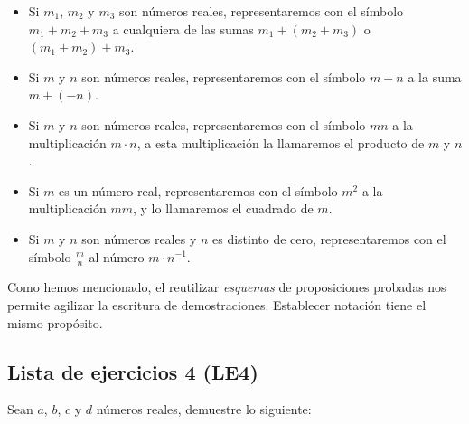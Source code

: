 \documentclass[11pt]{article}
\begin{document}
    \begin{itemize}
    \item Si $m_1$, $m_2$ y $m_3$ son números reales, representaremos con el símbolo $m_1+m_2+ m_3$ a cualquiera de las sumas $m_1+ \left(m_2+ m_3 \right)$ o $\left(m_1+ m_2 \right)+ m_3$.
    \item Si $m$ y $n$ son números reales, representaremos con el símbolo $m-n$ a la suma $m+ (-n)$.
    \item Si $m$ y $n$ son números reales, representaremos con el símbolo $mn$ a la multiplicación $m\cdot n$, a esta multiplicación la llamaremos el producto de $m$ y $n$.
    \item Si $m$ es un número real, representaremos con el símbolo $m^2$ a la multiplicación $mm$, y lo llamaremos el cuadrado de $m$.
    \item Si $m$ y $n$ son números reales y $n$ es distinto de cero, representaremos con el símbolo $ \frac{m}{n}$ al número $m \cdot n^{-1} $.
    \end{itemize}

Como hemos mencionado, el reutilizar \textit{esquemas} de proposiciones probadas nos permite agilizar la escritura de demostraciones. Establecer notación tiene el mismo propósito.

\subsection*{Lista de ejercicios 4 (LE4)}

Sean $a$, $b$, $c$ y $d$ números reales, demuestre lo siguiente:
\end{document}
